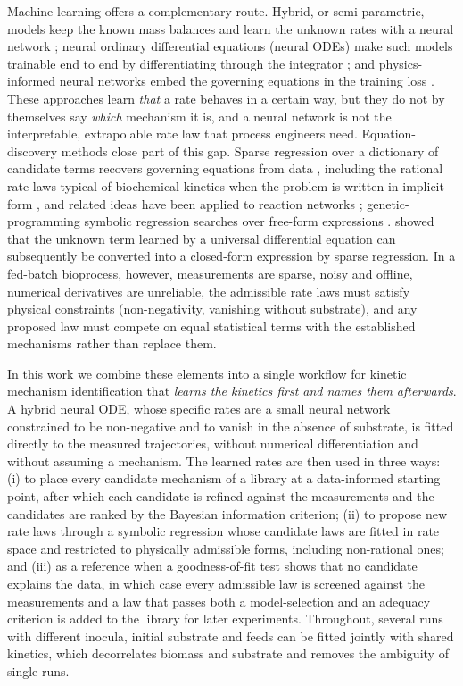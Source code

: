 Machine learning offers a complementary route. Hybrid, or semi-parametric, models keep the known mass balances and learn the unknown rates with a neural network \citep{Psichogios1992,Thompson1994,Oliveira2004,vonStosch2014,Sansana2021,Bradley2022}; neural ordinary differential equations (neural ODEs) make such models trainable end to end by differentiating through the integrator \citep{Chen2018,Kidger2021}; and physics-informed neural networks embed the governing equations in the training loss \citep{Raissi2019,Bangi2022}. These approaches learn \emph{that} a rate behaves in a certain way, but they do not by themselves say \emph{which} mechanism it is, and a neural network is not the interpretable, extrapolable rate law that process engineers need. Equation-discovery methods close part of this gap. Sparse regression over a dictionary of candidate terms recovers governing equations from data \citep{Brunton2016,Champion2019}, including the rational rate laws typical of biochemical kinetics when the problem is written in implicit form \citep{Mangan2016,Kaheman2020}, and related ideas have been applied to reaction networks \citep{Hoffmann2019,JiDeng2021}; genetic-programming symbolic regression searches over free-form expressions \citep{Schmidt2009,Cranmer2023}. \citet{Rackauckas2020} showed that the unknown term learned by a universal differential equation can subsequently be converted into a closed-form expression by sparse regression. In a fed-batch bioprocess, however, measurements are sparse, noisy and offline, numerical derivatives are unreliable, the admissible rate laws must satisfy physical constraints (non-negativity, vanishing without substrate), and any proposed law must compete on equal statistical terms with the established mechanisms rather than replace them.

In this work we combine these elements into a single workflow for kinetic mechanism identification that \emph{learns the kinetics first and names them afterwards}. A hybrid neural ODE, whose specific rates are a small neural network constrained to be non-negative and to vanish in the absence of substrate, is fitted directly to the measured trajectories, without numerical differentiation and without assuming a mechanism. The learned rates are then used in three ways: (i) to place every candidate mechanism of a library at a data-informed starting point, after which each candidate is refined against the measurements and the candidates are ranked by the Bayesian information criterion; (ii) to propose new rate laws through a symbolic regression whose candidate laws are fitted in rate space and restricted to physically admissible forms, including non-rational ones; and (iii) as a reference when a goodness-of-fit test shows that no candidate explains the data, in which case every admissible law is screened against the measurements and a law that passes both a model-selection and an adequacy criterion is added to the library for later experiments. Throughout, several runs with different inocula, initial substrate and feeds can be fitted jointly with shared kinetics, which decorrelates biomass and substrate and removes the ambiguity of single runs.

